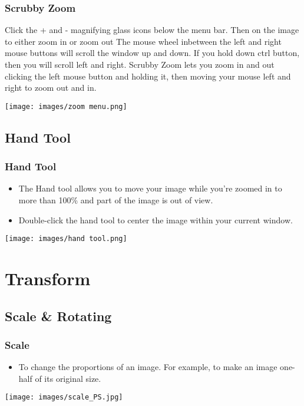 \documentclass{beamer}
\begin{document}
\begin{frame}
	\frametitle{Scrubby Zoom}
	\begin{outline}
		\1 Click the + and - magnifying glass icons below the menu bar.
		\2 Then on the image to either zoom in or zoom out
		\1 The mouse wheel inbetween the left and right mouse buttons will scroll the window up and down.
		\2 If you hold down ctrl button, then you will scroll left and right.
		\1 Scrubby Zoom lets you zoom in and out clicking the left mouse button and holding it, then moving your mouse left and right to zoom out and in.
	\end{outline}
	\begin{center}
		\texttt{[image: images/zoom menu.png]}
	\end{center}
\end{frame}

\subsection{Hand Tool}
\begin{frame}
	\frametitle{Hand Tool}
	\begin{itemize}
		\item The Hand tool allows you to move your image while you're zoomed in to more than 100\% and part of the image is out of view.
		\item Double-click the hand tool to center the image within your current window.
	\end{itemize}
	\begin{center}
		\texttt{[image: images/hand tool.png]}
	\end{center}
\end{frame}

	\section{Transform}
	
		\subsection{Scale \& Rotating}
\begin{frame}
	\frametitle{Scale}
	\begin{itemize}
		\item To change the proportions of an image. For example, to make an image one-half of its original size.
	\end{itemize}
	\begin{center}
		\texttt{[image: images/scale\_PS.jpg]}
	\end{center}
\end{frame}
\end{document}
